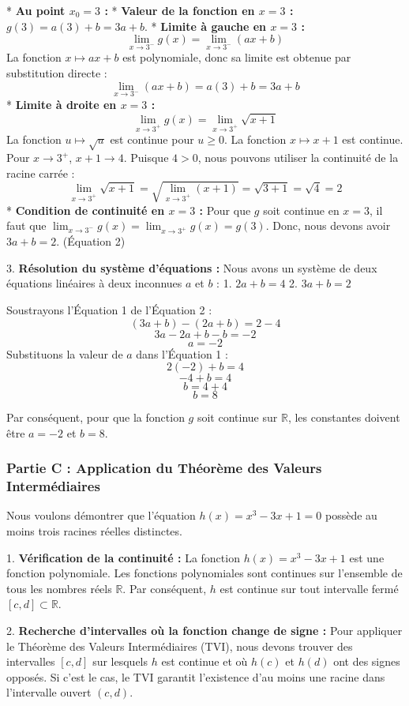 \documentclass[12pt,a4paper]{report}
\begin{document}
    *   \textbf{Au point $x_0 = 3$ :}
        *   \textbf{Valeur de la fonction en $x=3$ :} $g(3) = a(3) + b = 3a + b$.
        *   \textbf{Limite à gauche en $x=3$ :}
            $$ \lim_{x \to 3^-} g(x) = \lim_{x \to 3^-} (ax + b) $$
            La fonction $x \mapsto ax+b$ est polynomiale, donc sa limite est obtenue par substitution directe :
            $$ \lim_{x \to 3^-} (ax + b) = a(3) + b = 3a + b $$
        *   \textbf{Limite à droite en $x=3$ :}
            $$ \lim_{x \to 3^+} g(x) = \lim_{x \to 3^+} \sqrt{x + 1} $$
            La fonction $u \mapsto \sqrt{u}$ est continue pour $u \ge 0$. La fonction $x \mapsto x+1$ est continue. Pour $x \to 3^+$, $x+1 \to 4$. Puisque $4 > 0$, nous pouvons utiliser la continuité de la racine carrée :
            $$ \lim_{x \to 3^+} \sqrt{x + 1} = \sqrt{\lim_{x \to 3^+} (x + 1)} = \sqrt{3 + 1} = \sqrt{4} = 2 $$
        *   \textbf{Condition de continuité en $x=3$ :} Pour que $g$ soit continue en $x=3$, il faut que $\lim_{x \to 3^-} g(x) = \lim_{x \to 3^+} g(x) = g(3)$.
            Donc, nous devons avoir $3a + b = 2$. (Équation 2)

3.  \textbf{Résolution du système d'équations :}
    Nous avons un système de deux équations linéaires à deux inconnues $a$ et $b$ :
    1.  $2a + b = 4$
    2.  $3a + b = 2$

    Soustrayons l'Équation 1 de l'Équation 2 :
    $$ (3a + b) - (2a + b) = 2 - 4 $$
    $$ 3a - 2a + b - b = -2 $$
    $$ a = -2 $$
    Substituons la valeur de $a$ dans l'Équation 1 :
    $$ 2(-2) + b = 4 $$
    $$ -4 + b = 4 $$
    $$ b = 4 + 4 $$
    $$ b = 8 $$

    Par conséquent, pour que la fonction $g$ soit continue sur $\mathbb{R}$, les constantes doivent être $a = -2$ et $b = 8$.

\subsubsection{Partie C : Application du Théorème des Valeurs Intermédiaires}

Nous voulons démontrer que l'équation $h(x) = x^3 - 3x + 1 = 0$ possède au moins trois racines réelles distinctes.

1.  \textbf{Vérification de la continuité :}
    La fonction $h(x) = x^3 - 3x + 1$ est une fonction polynomiale. Les fonctions polynomiales sont continues sur l'ensemble de tous les nombres réels $\mathbb{R}$. Par conséquent, $h$ est continue sur tout intervalle fermé $[c, d] \subset \mathbb{R}$.

2.  \textbf{Recherche d'intervalles où la fonction change de signe :}
    Pour appliquer le Théorème des Valeurs Intermédiaires (TVI), nous devons trouver des intervalles $[c, d]$ sur lesquels $h$ est continue et où $h(c)$ et $h(d)$ ont des signes opposés. Si c'est le cas, le TVI garantit l'existence d'au moins une racine dans l'intervalle ouvert $(c, d)$.
\end{document}
